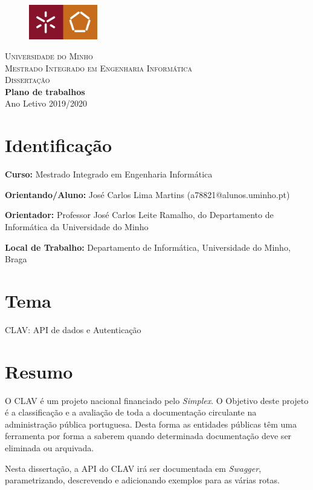 \documentclass{article}
\begin{document}
{
\center
\begin{figure}[H]
        \centering
        \includegraphics[width=3cm]{UM_EENG.jpg}
\end{figure}
\textsc{\Large Universidade do Minho} \\ [0.5cm]
\textsc{\Large Mestrado Integrado em Engenharia Informática} \\ [0.5cm]
\textsc{\large Dissertação} \\ [0.5cm]

{\LARGE \bfseries Plano de trabalhos} \\[0.5cm]

Ano Letivo 2019/2020 \\[0.2cm]
}

\section*{Identificação}

\textbf{Curso:} Mestrado Integrado em Engenharia Informática

\textbf{Orientando/Aluno:} José Carlos Lima Martins (a78821@alunos.uminho.pt)

\textbf{Orientador:} Professor José Carlos Leite Ramalho, do Departamento de Informática da Universidade do Minho

\textbf{Local de Trabalho:} Departamento de Informática, Universidade do Minho, Braga

\section*{Tema}

CLAV: API de dados e Autenticação

\section*{Resumo}

O CLAV é um projeto nacional financiado pelo \textit{Simplex}. O Objetivo deste projeto é a classificação e a avaliação de toda a documentação circulante na administração pública portuguesa. Desta forma as entidades públicas têm uma ferramenta por forma a saberem quando determinada documentação deve ser eliminada ou arquivada. 

Nesta dissertação, a API do CLAV irá ser documentada em \textit{Swagger}, parametrizando, descrevendo e adicionando exemplos para as várias rotas.
\end{document}
